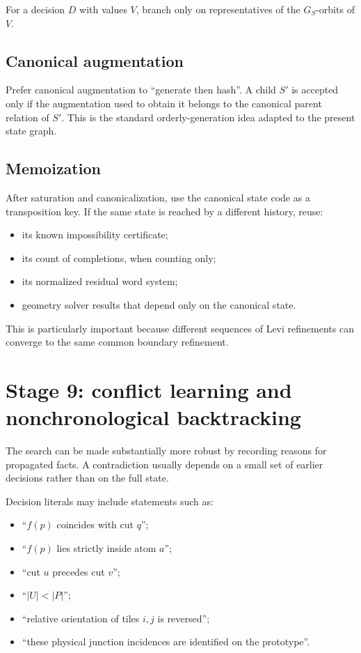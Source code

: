 \documentclass[11pt]{article}
\begin{document}
For a decision $D$ with values $V$, branch only on representatives of the $G_S$-orbits of $V$.

\subsection{Canonical augmentation}

Prefer canonical augmentation to ``generate then hash''.  A child $S'$ is accepted only if the augmentation used to obtain it belongs to the canonical parent relation of $S'$.  This is the standard orderly-generation idea adapted to the present state graph.

\subsection{Memoization}

After saturation and canonicalization, use the canonical state code as a transposition key.  If the same state is reached by a different history, reuse:
\begin{itemize}
  \item its known impossibility certificate;
  \item its count of completions, when counting only;
  \item its normalized residual word system;
  \item geometry solver results that depend only on the canonical state.
\end{itemize}

This is particularly important because different sequences of Levi refinements can converge to the same common boundary refinement.

\section{Stage 9: conflict learning and nonchronological backtracking}
\label{sec:learning}

The search can be made substantially more robust by recording reasons for propagated facts.  A contradiction usually depends on a small set of earlier decisions rather than on the full state.

Decision literals may include statements such as:
\begin{itemize}
  \item ``$f(p)$ coincides with cut $q$'';
  \item ``$f(p)$ lies strictly inside atom $a$'';
  \item ``cut $u$ precedes cut $v$'';
  \item ``$|U|<|P|$'';
  \item ``relative orientation of tiles $i,j$ is reversed'';
  \item ``these physical junction incidences are identified on the prototype''.
\end{itemize}
\end{document}
